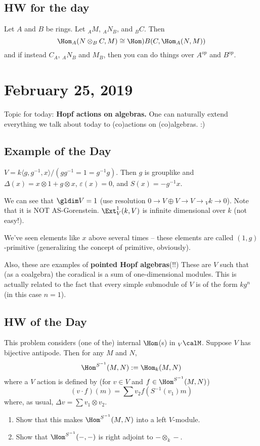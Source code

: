 \documentclass[12pt]{article}
\begin{document}
\subsection{HW for the day}
\begin{prob}
	Let $A$ and $B$ be rings. Let $_AM$, $_AN_B$, and $_BC$. Then 
	\[\Hom_A(N\otimes_B C,M)\cong \Hom)B(C, \Hom_A(N,M))\]
	and if instead $C_A$, $_AN_B$ and $M_B$, then you can do things over $A^{op}$ and $B^{op}$.
\end{prob}

\section{February 25, 2019}
Topic for today: \textbf{Hopf actions on algebras.} One can naturally extend everything we talk about
today to (co)actions on (co)algebras. :)
\subsection{Example of the Day}
\begin{ex}\label{ex-22519}
	$V=k\langle g,g^{-1},x\rangle/(gg^{-1}=1=g^{-1}g)$. Then $g$ is grouplike and $\Delta(x)=x\otimes1+g\otimes x$, 
	$\varepsilon(x)=0$, and $S(x)=-g^{-1}x$.

	We can see that $\gldim V=1$ (use resolution $0\to V\oplus V\to V\to {_V k}\to 0$). Note that
	it is NOT AS-Gorenstein. $\Ext_V^1(k,V)$ is infinite dimensional over $k$ (not easy!).
\end{ex}
\begin{rmk}
	We've seen elements like $x$ above several times -- these elements are called $(1,g)$-primitive 
	(generalizing the concept of primitive, obviously). 

	Also, these are examples of \textbf{pointed Hopf algebras}(!!) These are $V$ such that (as a
	coalgebra) the coradical is a sum of one-dimensional modules. This is actually related to the fact 
	that every simple submodule of $V$ is of the form $kg^n$ (in this case $n=1$).
\end{rmk}
\subsection{HW of the Day}
\begin{prob}
	This problem considers (one of the) internal $\Hom$(s) in $_V\calM$. Suppose $V$ has bijective 
	antipode. Then for any $M$ and $N$,
	\[\Hom^{S^{-1}}(M,N):=\Hom_k(M,N)\]
	where a $V$ action is defined by (for $v\in V$ and $f\in\Hom^{S^{-1}}(M,N)$) 
	\[(v\cdot f)(m)=\sum v_2f(S^{-1}(v_1)m)\]
	where, as usual, $\Delta v=\sum v_1\otimes v_2$.
	\begin{enumerate}
		\item Show that this makes $\Hom^{S^{-1}}(M,N)$ into a left $V$-module.
		\item Show that $\Hom^{S^{-1}}(-,-)$ is right adjoint to $-\otimes_k -$.
	\end{enumerate}
\end{prob}
\end{document}
